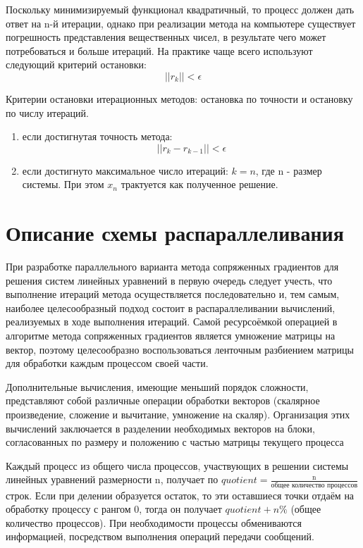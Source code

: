 \documentclass{report}
\begin{document}
\par Поскольку минимизируемый функционал квадратичный, то процесс должен дать ответ на n-й итерации, однако при реализации метода на компьютере существует погрешность представления вещественных чисел, в результате чего может потребоваться и больше итераций. На практике чаще всего используют следующий критерий остановки:
\begin{equation}
  || r_k || < \epsilon
\end{equation}
\par Критерии остановки итерационных методов: остановка по точности и остановку по числу итераций.
\begin{enumerate}
    \item если достигнутая точность метода:
    \begin{equation}
     || r_k - r_{k-1} || < \epsilon
    \end{equation}
    \item если достигнуто максимальное число итераций: $k = n$, где n - размер системы. При этом $x_n$ трактуется как полученное решение.
\end{enumerate}

\newpage

\section*{Описание схемы распараллеливания}
\par При разработке параллельного варианта метода сопряженных градиентов для решения систем линейных уравнений в первую очередь следует учесть, что выполнение итераций метода осуществляется последовательно и, тем самым, наиболее целесообразный подход состоит в распараллеливании вычислений, реализуемых в ходе выполнения итераций. Самой ресурсоёмкой операцией в алгоритме метода сопряженных градиентов является умножение матрицы на вектор, поэтому целесообразно воспользоваться ленточным разбиением матрицы для обработки каждым процессом своей части.
\par Дополнительные вычисления, имеющие меньший порядок сложности, представляют собой различные операции обработки векторов (скалярное произведение, сложение и вычитание, умножение на скаляр). Организация этих вычислений заключается в разделении необходимых векторов на блоки, согласованных по размеру и положению с частью матрицы текущего процесса
\par Каждый процесс из общего числа процессов, участвующих в решении системы линейных уравнений размерности n, получает по $quotient = \frac{\text{n}}{\text{общее количество процессов}}$ строк. Если при делении образуется остаток, то эти оставшиеся точки отдаём на обработку процессу с рангом 0, тогда он получает $quotient + n \%$ (общее количество процессов). При необходимости процессы обмениваются информацией, посредством выполнения операций передачи сообщений.
\newpage
\end{document}
